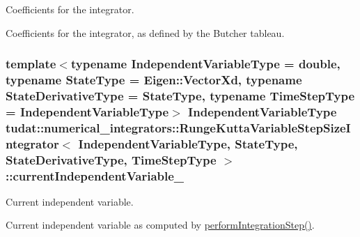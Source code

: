 Coefficients for the integrator. 

Coefficients for the integrator, as defined by the Butcher tableau. 
\subsubsection[{\texorpdfstring{current\+Independent\+Variable\+\_\+}{currentIndependentVariable_}}]{\setlength{\rightskip}{0pt plus 5cm}template$<$typename Independent\+Variable\+Type  = double, typename State\+Type  = Eigen\+::\+Vector\+Xd, typename State\+Derivative\+Type  = State\+Type, typename Time\+Step\+Type  = Independent\+Variable\+Type$>$ Independent\+Variable\+Type {\bf tudat\+::numerical\+\_\+integrators\+::\+Runge\+Kutta\+Variable\+Step\+Size\+Integrator}$<$ Independent\+Variable\+Type, State\+Type, State\+Derivative\+Type, Time\+Step\+Type $>$\+::current\+Independent\+Variable\+\_\+\hspace{0.3cm}{\ttfamily [protected]}}\hypertarget{classtudat_1_1numerical__integrators_1_1RungeKuttaVariableStepSizeIntegrator_ac89db3054b7e21a3b7ff4dc700d71cfb}{}\label{classtudat_1_1numerical__integrators_1_1RungeKuttaVariableStepSizeIntegrator_ac89db3054b7e21a3b7ff4dc700d71cfb}


Current independent variable. 

Current independent variable as computed by \hyperlink{classtudat_1_1numerical__integrators_1_1RungeKuttaVariableStepSizeIntegrator_a34e884253297c9bfb17d756c36510cc4}{perform\+Integration\+Step()}. 
